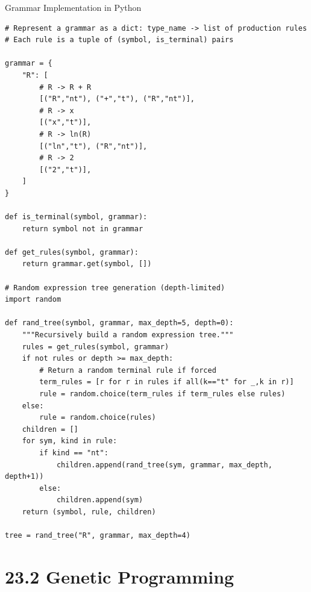 \documentclass[aspectratio=169,10pt]{beamer}
\begin{document}
\begin{frame}[fragile]{Grammar Implementation in Python}
\begin{lstlisting}[style=python]
# Represent a grammar as a dict: type_name -> list of production rules
# Each rule is a tuple of (symbol, is_terminal) pairs

grammar = {
    "R": [
        # R -> R + R
        [("R","nt"), ("+","t"), ("R","nt")],
        # R -> x
        [("x","t")],
        # R -> ln(R)
        [("ln","t"), ("R","nt")],
        # R -> 2
        [("2","t")],
    ]
}

def is_terminal(symbol, grammar):
    return symbol not in grammar

def get_rules(symbol, grammar):
    return grammar.get(symbol, [])

# Random expression tree generation (depth-limited)
import random

def rand_tree(symbol, grammar, max_depth=5, depth=0):
    """Recursively build a random expression tree."""
    rules = get_rules(symbol, grammar)
    if not rules or depth >= max_depth:
        # Return a random terminal rule if forced
        term_rules = [r for r in rules if all(k=="t" for _,k in r)]
        rule = random.choice(term_rules if term_rules else rules)
    else:
        rule = random.choice(rules)
    children = []
    for sym, kind in rule:
        if kind == "nt":
            children.append(rand_tree(sym, grammar, max_depth, depth+1))
        else:
            children.append(sym)
    return (symbol, rule, children)

tree = rand_tree("R", grammar, max_depth=4)
\end{lstlisting}
\end{frame}

\section{23.2 Genetic Programming}
\end{document}
